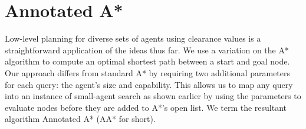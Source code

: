 \section{Annotated A*}
\label{aha:aastar}
Low-level planning for diverse sets of agents using clearance values is a straightforward application of the ideas thus far.
We use a variation on the A* algorithm \cite{astar} to compute an optimal shortest path between a start and goal node.  
Our approach differs from standard A* by requiring two additional parameters for each query: the agent's size and capability. This allows us to map any query into an instance of small-agent search as shown earlier by using the parameters to evaluate nodes before they are added to A*'s open list. We term the resultant algorithm Annotated A* (AA* for short).

